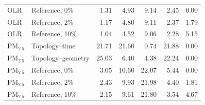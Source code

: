 \begin{table}[t]
\begin{tabular}{llrrrrr}
OLR & Reference, 0\% & 1.31 & 4.93 & 9.14 & 2.45 & 0.00 \\
OLR & Reference, 2\% & 1.17 & 4.80 & 9.11 & 2.37 & 1.79 \\
OLR & Reference, 10\% & 1.04 & 4.52 & 9.06 & 2.28 & 5.15 \\
PM$_{2.5}$ & Topology--time & 21.71 & 21.60 & 0.74 & 21.88 & 0.00 \\
PM$_{2.5}$ & Topology--geometry & 25.03 & 6.40 & 4.38 & 22.24 & 0.00 \\
PM$_{2.5}$ & Reference, 0\% & 3.05 & 10.60 & 22.07 & 5.44 & 0.00 \\
PM$_{2.5}$ & Reference, 2\% & 2.43 & 9.93 & 21.98 & 4.40 & 1.81 \\
PM$_{2.5}$ & Reference, 10\% & 2.15 & 9.61 & 21.80 & 3.54 & 4.67 \\
\bottomrule\end{tabular}\end{table}
